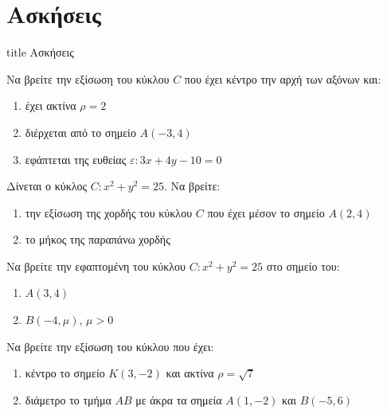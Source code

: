 \documentclass{presentation}
\begin{document}
\section{Ασκήσεις}

\begin{frame}[noframenumbering]
  \vfill
  \centering
  \begin{beamercolorbox}[sep=8pt,center,shadow=true,rounded=true]{title}
    Ασκήσεις
  \end{beamercolorbox}
  \vfill
\end{frame}

\begin{askisi}
  Να βρείτε την εξίσωση του κύκλου $C$ που έχει κέντρο την αρχή των αξόνων και:
  \begin{enumerate}
    \item<1-> έχει ακτίνα $ρ=2$
    \item<2-> διέρχεται από το σημείο $Α(-3,4)$
    \item<3-> εφάπτεται της ευθείας $ε:3x+4y-10=0$
  \end{enumerate}

\end{askisi}

\begin{askisi}
  Δίνεται ο κύκλος $C:x^2+y^2=25$. Να βρείτε:
  \begin{enumerate}
    \item<1-> την εξίσωση της χορδής του κύκλου $C$ που έχει μέσον το σημείο $Α(2,4)$
    \item<2-> το μήκος της παραπάνω χορδής
  \end{enumerate}

\end{askisi}

\begin{askisi}
  Να βρείτε την εφαπτομένη του κύκλου $C:x^2+y^2=25$ στο σημείο του:
  \begin{enumerate}
    \item<1-> $Α(3,4)$
    \item<2-> $Β(-4,μ)$, $μ>0$
  \end{enumerate}

\end{askisi}

\begin{askisi}
  Να βρείτε την εξίσωση του κύκλου που έχει:
  \begin{enumerate}
    \item<1-> κέντρο το σημείο $Κ(3,-2)$ και ακτίνα $ρ=\sqrt{7}$
    \item<2-> διάμετρο το τμήμα $ΑΒ$ με άκρα τα σημεία $Α(1,-2)$ και $Β(-5,6)$
  \end{enumerate}

\end{askisi}
\end{document}
